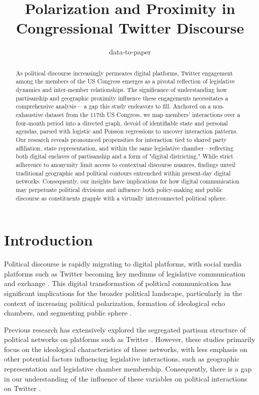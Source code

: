 \documentclass[11pt]{article}
\title{Polarization and Proximity in Congressional Twitter Discourse}
\author{data-to-paper}
\begin{document}
\maketitle
\begin{abstract}
As political discourse increasingly permeates digital platforms, Twitter engagement among the members of the US Congress emerges as a pivotal reflection of legislative dynamics and inter-member relationships. The significance of understanding how partisanship and geographic proximity influence these engagements necessitates a comprehensive analysis— a gap this study endeavors to fill. Anchored on a non-exhaustive dataset from the 117th US Congress, we map members' interactions over a four-month period into a directed graph, devoid of identifiable state and personal agendas, parsed with logistic and Poisson regressions to uncover interaction patterns. Our research reveals pronounced propensities for interaction tied to shared party affiliation, state representation, and within the same legislative chamber—reflecting both digital enclaves of partisanship and a form of "digital districting." While strict adherence to anonymity limit access to contextual discourse nuances, findings unveil traditional geographic and political contours entrenched within present-day digital networks. Consequently, our insights have implications for how digital communication may perpetuate political divisions and influence both policy-making and public discourse as constituents grapple with a virtually interconnected political sphere.
\end{abstract}
\section*{Introduction}

Political discourse is rapidly migrating to digital platforms, with social media platforms such as Twitter becoming key mediums of legislative communication and exchange \cite{Conover2011PoliticalPO, Calderaro2018SocialMA, Stier2018ElectionCO}. This digital transformation of political communication has significant implications for the broader political landscape, particularly in the context of increasing political polarization, formation of ideological echo chambers, and segmenting public sphere \cite{Conover2011PoliticalPO, Garimella2018PoliticalDO, Gaumont2018ReconstructionOT}.

Previous research has extensively explored the segregated partisan structure of political networks on platforms such as Twitter \cite{Conover2011PoliticalPO, Gaumont2018ReconstructionOT, Chamberlain2021ANA}. However, these studies primarily focus on the ideological characteristics of these networks, with less emphasis on other potential factors influencing legislative interactions, such as geographic representation and legislative chamber membership. Consequently, there is a gap in our understanding of the influence of these variables on political interactions on Twitter \cite{Balcells2016TweetingOC, Wei2017MeasuringSI, Bailey2018SocialCM}.
\end{document}
